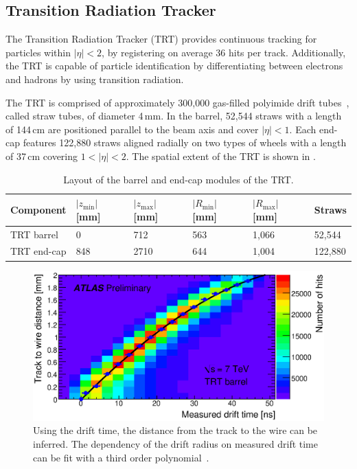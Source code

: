 %
\subsection{Transition Radiation Tracker}
The Transition Radiation Tracker (TRT) provides continuous tracking for particles within $|\eta|<2$, by registering on average 36 hits per track. Additionally, the TRT is capable of particle identification by differentiating between electrons and hadrons by using transition radiation.

The TRT is comprised of approximately 300,000 gas-filled polyimide drift tubes~\cite{TRT_sensors}, called straw tubes, of diameter 4\,mm. In the barrel, 52,544 straws with a length of 144\,cm are positioned parallel to the beam axis  and cover $|\eta| < 1$. Each end-cap features 122,880 straws aligned radially on two types of wheels with a length of 37\,cm covering $1<|\eta|<2$. The spatial extent of the TRT is shown in \Tab{\ref{tab:trt_layout}}.

\begin{table}[tbp]
\begin{center}
\caption[Transition Radiation Tracker spatial layout]{Layout of the barrel and end-cap modules of the TRT.}
\label{tab:trt_layout}
\begin{tabular}{llllll}
\hline
\textbf{Component} & $|z_{\text{min}}|$ [mm]& $|z_{\text{max}}|$ [mm]& $|R_{\text{min}}|$ [mm]& $|R_{\text{max}}|$ [mm] & \textbf{Straws} \\ \hline\hline
TRT barrel & 0 & 712 & 563 & 1,066 & 52,544\\
TRT end-cap & 848 & 2710 & 644 & 1,004 & 122,880 \\ 
\hline
\end{tabular}
\end{center}
\end{table}

\begin{figure}
\begin{center}
	\includegraphics[width=.99\linewidth]{figures/ATLAS/trt_drift}
	\caption[Transition Radiation Tracker wire impact parameter vs drift time]{Using the drift time, the distance from the track to the wire can be inferred. The dependency of the drift radius on measured drift time can be fit with a third order polynomial~\cite{trt_twiki}.}
	\label{fig:trt_drift}
\end{center}
\end{figure}


